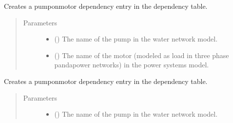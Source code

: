 \documentclass[letterpaper,10pt,english]{sphinxmanual}
\begin{document}
\begin{fulllineitems}
\begin{fulllineitems}
\label{\detokenize{apidoc:dreaminsg_integrated_model.src.network_sim_models.interdependencies.DependencyTable.add_pump_loadmotor_coupling}}
\sphinxAtStartPar
Creates a pump\sphinxhyphen{}on\sphinxhyphen{}motor dependency entry in the dependency table.
\begin{quote}\begin{description}
\item[{Parameters}] \leavevmode\begin{itemize}
\item {} 
\sphinxAtStartPar
{} () \textendash{} The name of the pump in the water network model.

\item {} 
\sphinxAtStartPar
{} () \textendash{} The name of the motor (modeled as load in three phase pandapower networks) in the power systems model.

\end{itemize}

\end{description}\end{quote}

\end{fulllineitems}


\begin{fulllineitems}
\label{\detokenize{apidoc:dreaminsg_integrated_model.src.network_sim_models.interdependencies.DependencyTable.add_pump_motor_coupling}}
\sphinxAtStartPar
Creates a pump\sphinxhyphen{}on\sphinxhyphen{}motor dependency entry in the dependency table.
\begin{quote}\begin{description}
\item[{Parameters}] \leavevmode\begin{itemize}
\item {} 
\sphinxAtStartPar
{} () \textendash{} The name of the pump in the water network model.


\end{itemize}
\end{description}
\end{quote}
\end{fulllineitems}
\end{fulllineitems}
\end{document}
